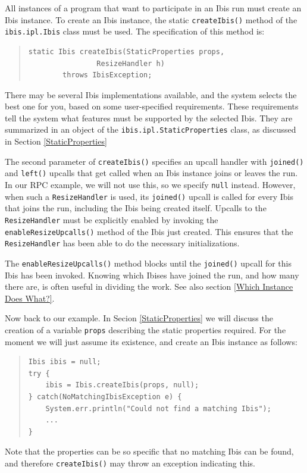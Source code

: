 \documentclass[10pt]{article}
\begin{document}
All instances of a program that want to participate in an Ibis run
must create an Ibis instance.
To create an Ibis instance, the static \texttt{createIbis()} method of the
\texttt{ibis.ipl.Ibis} class must be used.
The specification of this method is:
{\small
\begin{quote}
\begin{verbatim}
static Ibis createIbis(StaticProperties props,
                ResizeHandler h)
        throws IbisException;
\end{verbatim}
\end{quote}
}
There may be several Ibis implementations available, and
the system selects the best one for you, based on some
user-specified requirements.
These requirements tell the system what features must be supported
by the selected Ibis.
They are summarized in an object of the
\texttt{ibis.ipl.StaticProperties} class, as discussed in Section
\ref{StaticProperties}

The second parameter of \texttt{createIbis()} specifies an upcall handler
with \texttt{joined()} and \texttt{left()} upcalls that get called when an Ibis
instance joins or leaves the run.  In our RPC example, we will not use this, so we
specify \texttt{null} instead.  However, when such a \texttt{ResizeHandler}
is used, its \texttt{joined()} upcall is called for every Ibis that joins the
run, including the Ibis being created itself.
Upcalls to the \texttt{ResizeHandler} must be explicitly enabled by
invoking the \texttt{enableResizeUpcalls()} method of the Ibis
just created. This ensures that the \texttt{ResizeHandler} has been
able to do the necessary initializations.

The \texttt{enableResizeUpcalls()} method blocks until the
\texttt{joined()} upcall for this Ibis has been invoked.  Knowing which Ibises
have joined the run, and how many there are, is often useful in dividing
the work. See also section \ref{Which Instance Does What?}.

Now back to our example. In Secion \ref{StaticProperties} we will
discuss the creation of a variable \texttt{props} describing the
static properties required. For the moment we will just assume its
existence, and create an Ibis instance as follows:
{\small
\begin{quote}
\begin{verbatim}
Ibis ibis = null;
try {
    ibis = Ibis.createIbis(props, null);
} catch(NoMatchingIbisException e) {
    System.err.println("Could not find a matching Ibis");
    ...
}
\end{verbatim}
\end{quote}
}
Note that the properties can be so specific that no matching Ibis
can be found, and therefore \texttt{createIbis()} may throw an exception
indicating this.
\end{document}
